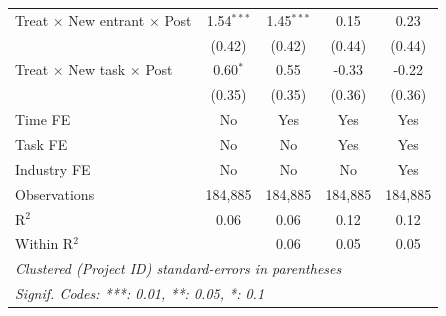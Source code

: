 \documentclass[
]{article}
\begin{document}
\begin{tabular}{lcccc}
   Treat $\times$ New entrant $\times$ Post   & 1.54$^{***}$  & 1.45$^{***}$  & 0.15          & 0.23\\   
                                              & (0.42)        & (0.42)        & (0.44)        & (0.44)\\   
   Treat $\times$ New task $\times$ Post      & 0.60$^{*}$    & 0.55          & -0.33         & -0.22\\   
                                              & (0.35)        & (0.35)        & (0.36)        & (0.36)\\   
   Time FE                                    & No            & Yes           & Yes           & Yes\\  
   Task FE                                    & No            & No            & Yes           & Yes\\  
   Industry FE                                & No            & No            & No            & Yes\\  
   Observations                               & 184,885       & 184,885       & 184,885       & 184,885\\  
   R$^2$                                      & 0.06          & 0.06          & 0.12          & 0.12\\  
   Within R$^2$                               &               & 0.06          & 0.05          & 0.05\\  
   \midrule
   \multicolumn{5}{l}{\emph{Clustered (Project ID) standard-errors in parentheses}}\\
   \multicolumn{5}{l}{\emph{Signif. Codes: ***: 0.01, **: 0.05, *: 0.1}}\\
\end{tabular}
\par\endgroup
\begingroup
\centering
\small
\end{document}
